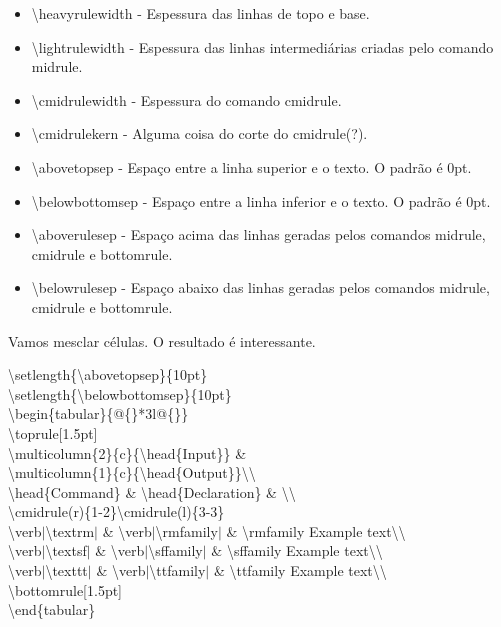 \begin{itemize}
	\item \textbackslash heavyrulewidth - Espessura das linhas de topo e base.
	\item \textbackslash lightrulewidth - Espessura das linhas
		intermediárias criadas pelo comando midrule.
	\item \textbackslash cmidrulewidth - Espessura do comando cmidrule.
	\item \textbackslash cmidrulekern - Alguma coisa do corte do
		cmidrule(?).
	\item \textbackslash abovetopsep - Espaço entre a linha superior e o
		texto. O padrão é 0pt.
	\item \textbackslash belowbottomsep - Espaço entre a linha inferior e o
		texto. O padrão é 0pt.
	\item \textbackslash aboverulesep - Espaço acima das linhas geradas pelos comandos midrule, cmidrule e bottomrule.
	\item \textbackslash belowrulesep - Espaço abaixo das linhas geradas pelos comandos midrule, cmidrule e bottomrule.
\end{itemize}

Vamos mesclar células. O resultado é interessante.


\ttfamily
\noindent\textbackslash setlength\{\textbackslash abovetopsep\}\{10pt\}\\
\textbackslash setlength\{\textbackslash belowbottomsep\}\{10pt\}\\
\textbackslash begin\{tabular\}\{@\{\}*3l@\{\}\}\\
	\textbackslash toprule[1.5pt]\\
	\textbackslash multicolumn\{2\}\{c\}\{\textbackslash head\{Input\}\} \&\\
	\textbackslash multicolumn\{1\}\{c\}\{\textbackslash head\{Output\}\}\textbackslash \textbackslash \\
	\textbackslash head\{Command\} \& \textbackslash head\{Declaration\} \& \textbackslash \textbackslash \\
	\textbackslash cmidrule(r)\{1-2\}\textbackslash cmidrule(l)\{3-3\}\\
	\textbackslash verb$|$\textbackslash textrm$|$ \& \textbackslash verb$|$\textbackslash rmfamily$|$ \& \textbackslash rmfamily Example text\textbackslash \textbackslash \\
	\textbackslash verb$|$\textbackslash textsf$|$ \& \textbackslash verb$|$\textbackslash sffamily$|$ \& \textbackslash sffamily Example text\textbackslash \textbackslash \\
	\textbackslash verb$|$\textbackslash texttt$|$ \& \textbackslash verb$|$\textbackslash ttfamily$|$ \& \textbackslash ttfamily Example text\textbackslash \textbackslash \\
	\textbackslash bottomrule[1.5pt]\\
\textbackslash end\{tabular\}\\
\sffamily


